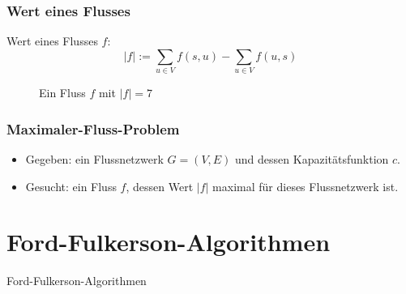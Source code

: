 \documentclass[draft]{beamer}
\newcommand{\ff}{Ford-Fulkerson}
\begin{document}
\begin{frame}
\frametitle{Wert eines Flusses}
Wert eines Flusses $f$:
\begin{equation*}
\lvert f \rvert := \sum_{u\in V} f(s,u) - \sum_{u\in V} f(u,s)
\end{equation*}
\pause
\begin{figure}
\begin{adjustbox}{width=0.8\textwidth}
\end{adjustbox}
\caption{Ein Fluss $f$ mit $\lvert f\rvert = 7$}
\end{figure}
\end{frame}

\begin{frame}
\frametitle{Maximaler-Fluss-Problem}
\begin{itemize}
\item<1-> Gegeben: ein Flussnetzwerk $G = (V,E)$ und dessen Kapazitätsfunktion $c$.
\vfill
\item<2-> Gesucht: ein Fluss $f$, dessen Wert $\lvert f \rvert$ maximal für dieses Flussnetzwerk ist.
\end{itemize}
\end{frame}

\section{\ff -Algorithmen}
\begin{frame}[plain]
\begin{center}
\begin{LARGE}
\ff -Algorithmen
\end{LARGE}
\end{center}
\end{frame}
\end{document}
